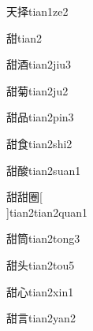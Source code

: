 \begin{verbete}[4;8]{天择}{tian1ze2}
\end{verbete}

\begin{verbete}[11]{甜}{tian2}
\end{verbete}

\begin{verbete}[11;10]{甜酒}{tian2jiu3}
\end{verbete}

\begin{verbete}[11;11]{甜菊}{tian2ju2}
\end{verbete}

\begin{verbete}[11;9]{甜品}{tian2pin3}
\end{verbete}

\begin{verbete}[11;9]{甜食}{tian2shi2}
\end{verbete}

\begin{verbete}[11;14]{甜酸}{tian2suan1}
\end{verbete}

\begin{verbete}[11;11;11]{甜甜圈}[\\]{tian2tian2quan1}
\end{verbete}

\begin{verbete}[11;12]{甜筒}{tian2tong3}
\end{verbete}

\begin{verbete}[11;5]{甜头}{tian2tou5}
\end{verbete}

\begin{verbete}[11;4]{甜心}{tian2xin1}
\end{verbete}

\begin{verbete}[11;7]{甜言}{tian2yan2}
\end{verbete}

